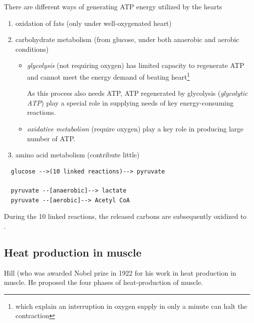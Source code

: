 There are different ways of generating ATP energy utilized by the hearts
\begin{enumerate}

\item oxidation of fats (only under well-oxygenated heart)

\item carbohydrate metabolism (from glucose, under both anaerobic and
  aerobic conditions)

  \begin{itemize}
  \item {\it glycolysis} (not requiring oxygen) has limited capacity to
  regenerate ATP and cannot meet the energy demand of beating
    heart\footnote{which explain an interruption in oxygen supply in
      only a minute can halt the contraction}
      
As this process also needs ATP, ATP regenerated by glycolysis ({\it glycolytic
ATP}) play a special role in supplying needs of key energy-consuming reactions.

  \item {\it oxidative metabolism} (require oxygen) play a key role in producing
  large number of ATP. 
  \end{itemize}

\item amino acid metabolism (contribute little)

\end{enumerate}


\begin{framed}
\begin{verbatim}
  glucose -->(10 linked reactions)--> pyruvate 
 
  pyruvate --[anaerobic]--> lactate
  pyruvate --[aerobic]--> Acetyl CoA
\end{verbatim}
During the 10 linked reactions, the released carbons are subsequently
oxidized to . 

\end{framed}

\subsection{Heat production in muscle}
\label{sec:heat-production-in-muscle}

Hill (who was awarded Nobel prize in 1922 for his work in heat production in
muscle. He proposed the four phases of heat-production of muscle.




